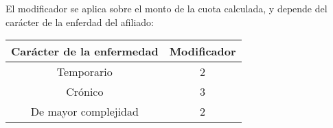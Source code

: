 El modificador se aplica sobre el monto de la cuota calculada, y depende del carácter de la enferdad del afiliado:

\begin{table}[H]
    \centering
\begin{tabular}{|c|c|}
    \hline
    Carácter de la enfermedad & Modificador \\ \hline
    Temporario & 2 \\ \hline
    Crónico & 3 \\ \hline
    De mayor complejidad & 2 \\ \hline
\end{tabular}
\end{table}

